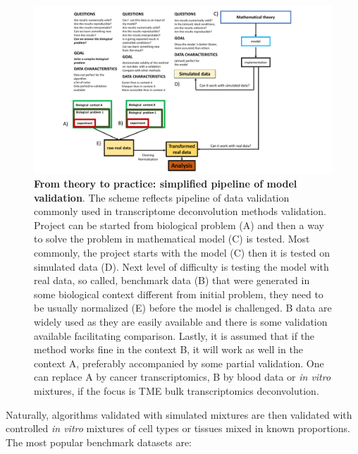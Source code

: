 \documentclass[12pt,]{book}
\theoremstyle{definition}
\theoremstyle{definition}
\theoremstyle{definition}
\theoremstyle{remark}
\begin{document}
\begin{figure}

{\centering \includegraphics[width=1\linewidth]{figures-ext/dataVal} 

}

\caption[From theory to practice: simplified pipeline of model validation]{\textbf{From theory to practice: simplified
pipeline of model validation}. The scheme reflects pipeline of data
validation commonly used in transcriptome deconvolution methods
validation. Project can be started from biological problem (A) and then
a way to solve the problem in mathematical model (C) is tested. Most
commonly, the project starts with the model (C) then it is tested on
simulated data (D). Next level of difficulty is testing the model with
real data, so called, benchmark data (B) that were generated in some
biological context different from initial problem, they need to be
usually normalized (E) before the model is challenged. B data are widely
used as they are easily available and there is some validation available
facilitating comparison. Lastly, it is assumed that if the method works
fine in the context B, it will work as well in the context A, preferably
accompanied by some partial validation. One can replace A by cancer
transcriptomics, B by blood data or \emph{in vitro} mixtures, if the
focus is TME bulk transcriptomics deconvolution.}\label{fig:dataVal}
\end{figure}


















Naturally, algorithms validated with simulated mixtures are then
validated with controlled \emph{in vitro} mixtures of cell types or
tissues mixed in known proportions. The most popular benchmark datasets
are:
\end{document}
